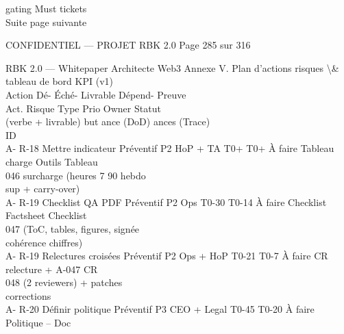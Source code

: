 gating Must                                                            tickets\\
Suite page suivante\\
\vspace{0.5em}
\vspace{0.5em}
\vspace{0.5em}
\vspace{0.5em}
\begin{confidential}CONFIDENTIEL — PROJET RBK 2.0                                           Page 285 sur 316\end{confidential}
RBK 2.0 — Whitepaper Architecte Web3                                                                         Annexe V. Plan d’actions risques \textbackslash{}& tableau de bord KPI (v1)\\
\vspace{0.5em}
\vspace{0.5em}
Action                                            Dé- Éché-             Livrable       Dépend- Preuve\\
Act. Risque                        Type      Prio Owner                   Statut\\
(verbe + livrable)                                but ance              (DoD)          ances   (Trace)\\
ID\\
A- R-18     Mettre indicateur      Préventif P2   HoP + TA    T0+ T0+ À faire       Tableau charge Outils   Tableau\\
046         surcharge (heures                                 7     90              hebdo\\
sup + carry-over)\\
A- R-19     Checklist QA PDF Préventif P2         Ops         T0-30 T0-14 À faire   Checklist      Factsheet Checklist\\
047         (ToC, tables, figures,                                                  signée\\
cohérence chiffres)\\
A- R-19     Relectures croisées Préventif P2      Ops + HoP T0-21 T0-7 À faire      CR relecture + A-047    CR\\
048         (2 reviewers) +                                                         patches\\
corrections\\
A- R-20     Définir politique      Préventif P3   CEO + Legal T0-45 T0-20 À faire   Politique      –        Doc\\

